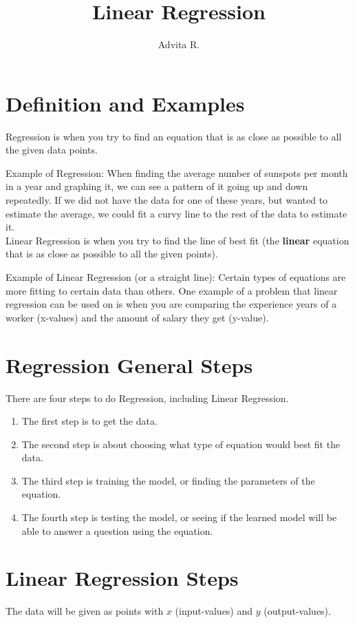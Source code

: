 \documentclass{article}
\title{Linear Regression}
\author{Advita R.}
\begin{document}
\maketitle
\section{Definition and Examples}
Regression is when you try to find an equation that is as close as possible to all the given data points.

Example of Regression: When finding the average number of sunspots per month in a year and graphing it, we can see a pattern of it going up and down repeatedly. If we did not have the data for one of these years, but wanted to estimate the average, we could fit a curvy line to the rest of the data to estimate it. \\

Linear Regression is when you try to find the line of best fit (the \textbf{linear} equation that is as close as possible to all the given points). 

Example of Linear Regression (or a straight line): Certain types of equations are more fitting to certain data than others. One example of a problem that linear regression can be used on is when you are comparing the experience years of a worker (x-values) and the amount of salary they get (y-value).\\

\section{Regression General Steps}
There are four steps to do Regression, including Linear Regression. 
\begin{enumerate}
    \item The first step is to get the data.
    \item The second step is about choosing what type of equation would best fit the data.
    \item The third step is training the model, or finding the parameters of the equation. 
    \item The fourth step is testing the model, or seeing if the learned model will be able to answer a question using the equation. \\
\end{enumerate}
\newpage
\section{Linear Regression Steps}
The data will be given as points with $x$ (input-values) and $y$ (output-values).
\end{document}
